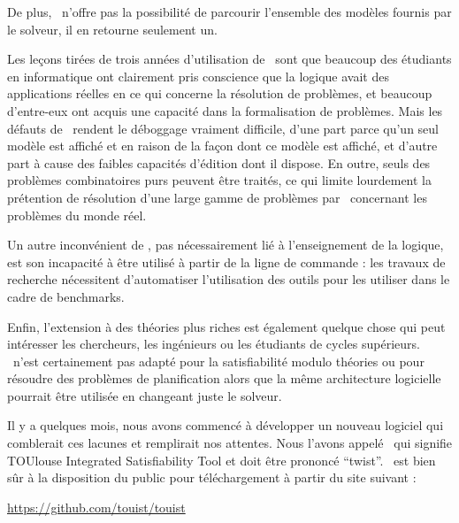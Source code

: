 De plus, \satoulouse\ n'offre pas la possibilité de parcourir l'ensemble des modèles fournis par le solveur, il en retourne seulement un.






\color{red}
Les leçons tirées de trois années d'utilisation de \satoulouse\ sont que beaucoup des étudiants en informatique ont clairement pris conscience que la logique avait des applications réelles en ce qui concerne la résolution de problèmes, et beaucoup d'entre-eux ont acquis une capacité dans la formalisation de problèmes. Mais les défauts de \satoulouse\ rendent le déboggage vraiment difficile, d'une part parce qu'un seul modèle est affiché et en raison de la façon dont ce modèle est affiché, et d'autre part à cause des faibles capacités d'édition dont il dispose. En outre, seuls des problèmes combinatoires purs peuvent être traités, ce qui limite lourdement la prétention de résolution d'une large gamme de problèmes par \satoulouse\ concernant les problèmes du monde réel.

Un autre inconvénient de \satoulouse, pas nécessairement lié à l'enseignement de la logique, est son incapacité à être utilisé à partir de la ligne de commande : les travaux de recherche nécessitent d'automatiser l'utilisation des outils pour les utiliser dans le cadre de benchmarks.

Enfin, l'extension à des théories plus riches est également quelque chose qui peut intéresser les chercheurs, les ingénieurs ou les étudiants de cycles supérieurs. \satoulouse\ n'est certainement pas adapté pour la satisfiabilité modulo théories ou pour résoudre des problèmes de planification alors que la même architecture logicielle pourrait être utilisée en changeant juste le solveur.


Il y a quelques mois, nous avons commencé à développer un nouveau logiciel qui comblerait ces lacunes et remplirait nos attentes. Nous l'avons appelé \nameTool\ qui signifie TOUlouse Integrated Satisfiability Tool et doit être prononcé ``twist''.
 \nameTool\ est bien sûr à la disposition du public pour téléchargement à partir du site suivant :
\begin{center}\url{ https://github.com/touist/touist }\end{center}
\color{black}


